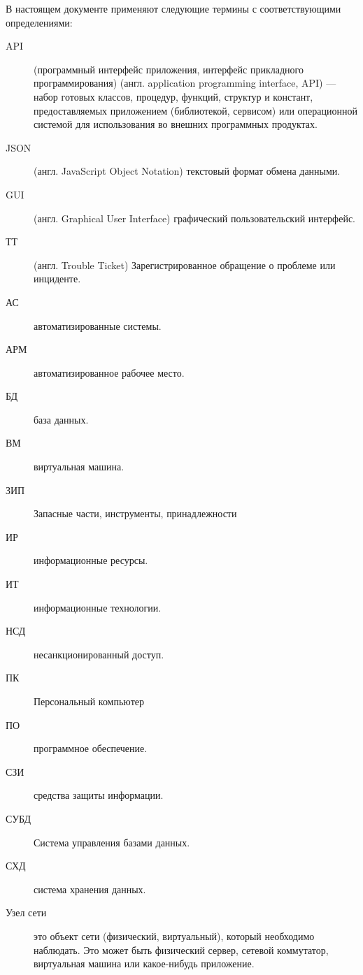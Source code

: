 \Abbreviations

В настоящем документе применяют следующие термины с соответствующими определениями:
\begin{description}
\item [API] (программный интерфейс приложения, интерфейс прикладного программирования) (англ. application programming interface, API) — набор готовых классов, процедур, функций, структур и констант, предоставляемых приложением (библиотекой, сервисом) или операционной системой для использования во внешних программных продуктах.
\item [JSON] (англ. JavaScript Object Notation) текстовый формат обмена данными.
\item [GUI] (англ. Graphical User Interface) графический пользовательский интерфейс.
\item [ТТ] (англ. Trouble Ticket) Зарегистрированное обращение о проблеме или инциденте.
\item [АС] автоматизированные системы.
\item [АРМ] автоматизированное рабочее место.
\item [БД] база данных.
\item [ВМ] виртуальная машина.
\item [ЗИП] Запасные части, инструменты, принадлежности
\item [ИР] информационные ресурсы.
\item [ИТ] информационные технологии.
\item [НСД] несанкционированный доступ.
\item [ПК] Персональный компьютер
\item [ПО] программное обеспечение.
\item [СЗИ] средства защиты информации.
\item [СУБД] Система управления базами данных.
\item [СХД] система хранения данных.
\item [Узел сети] это объект сети (физический, виртуальный), который необходимо наблюдать. Это может быть физический сервер, сетевой коммутатор, виртуальная машина или какое-нибудь приложение.

\end{description}